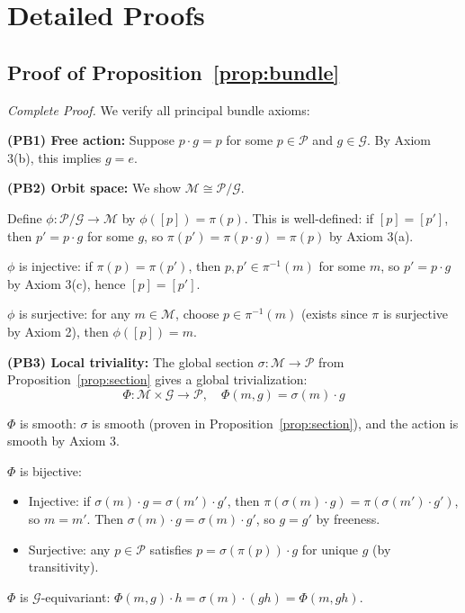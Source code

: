 \documentclass[11pt]{article}
\begin{document}
\section{Detailed Proofs}

\subsection{Proof of Proposition~\ref{prop:bundle}}

\textit{Complete Proof.} We verify all principal bundle axioms:

\textbf{(PB1) Free action:} Suppose $p \cdot g = p$ for some $p \in \mathcal{P}$ and $g \in \mathcal{G}$. By Axiom 3(b), this
implies $g = e$.

\textbf{(PB2) Orbit space:} We show $\mathcal{M} \cong \mathcal{P}/\mathcal{G}$.

Define $\phi : \mathcal{P}/\mathcal{G} \to \mathcal{M}$ by $\phi([p]) = \pi(p)$. This is well-defined: if $[p] = [p']$, then $p' = p \cdot g$ for
some $g$, so $\pi(p') = \pi(p \cdot g) = \pi(p)$ by Axiom 3(a).

$\phi$ is injective: if $\pi(p) = \pi(p')$, then $p, p' \in \pi^{-1}(m)$ for some $m$, so $p' = p \cdot g$ by Axiom 3(c),
hence $[p] = [p']$.

$\phi$ is surjective: for any $m \in \mathcal{M}$, choose $p \in \pi^{-1}(m)$ (exists since $\pi$ is surjective by Axiom
2), then $\phi([p]) = m$.

\textbf{(PB3) Local triviality:} The global section $\sigma : \mathcal{M} \to \mathcal{P}$ from Proposition~\ref{prop:section} gives a global
trivialization:
\[
\Phi : \mathcal{M} \times \mathcal{G} \to \mathcal{P}, \quad \Phi(m, g) = \sigma(m) \cdot g
\]

$\Phi$ is smooth: $\sigma$ is smooth (proven in Proposition~\ref{prop:section}), and the action is smooth by Axiom
3.

$\Phi$ is bijective:
\begin{itemize}
    \item Injective: if $\sigma(m) \cdot g = \sigma(m') \cdot g'$, then $\pi(\sigma(m) \cdot g) = \pi(\sigma(m') \cdot g')$, so $m = m'$. Then $\sigma(m) \cdot g = \sigma(m) \cdot g'$, so $g = g'$ by freeness.
    \item Surjective: any $p \in \mathcal{P}$ satisfies $p = \sigma(\pi(p)) \cdot g$ for unique $g$ (by transitivity).
\end{itemize}

$\Phi$ is $\mathcal{G}$-equivariant: $\Phi(m, g) \cdot h = \sigma(m) \cdot (gh) = \Phi(m, gh)$.
\end{document}
